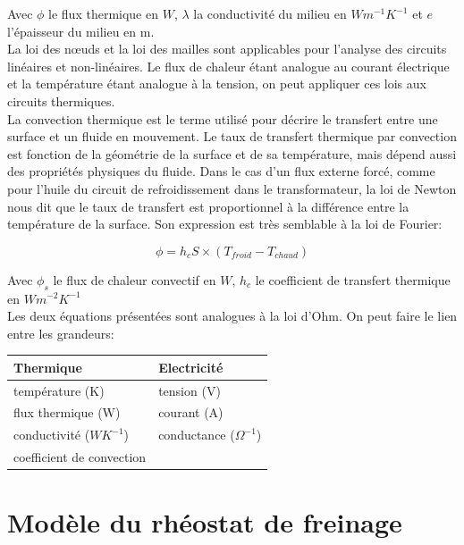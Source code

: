 \documentclass[a4paper]{report}
\begin{document}
	Avec $ \phi $ le flux thermique en $ W $, $ \lambda $ la conductivité du milieu en $ W m^{-1} K^{-1} $ et $ e $ l'épaisseur du milieu en m.\\
	
	La loi des nœuds et la loi des mailles sont applicables pour l'analyse des circuits linéaires et non-linéaires. Le flux de chaleur étant analogue au courant électrique et la température étant analogue à la tension, on peut appliquer ces lois aux circuits thermiques.\\
	
	La convection thermique est le terme utilisé pour décrire le transfert entre une surface et un fluide en
	mouvement. Le taux de transfert thermique par convection est fonction de la géométrie de la surface et de sa 
	température, mais dépend aussi des propriétés physiques du fluide. Dans le cas d'un flux externe forcé, comme pour l'huile du circuit de refroidissement dans le transformateur,  la loi de Newton nous dit que le taux de transfert est proportionnel à la différence entre la température de la surface. Son expression est très semblable à la loi de Fourier:
	
	\begin{equation}
		\phi = h_c S \times (T_{froid} - T_{chaud}) 
	\end{equation}
	
	Avec $ \phi_s $ le flux de chaleur convectif en $ W $, $h_c$ le coefficient de transfert thermique en $ W 			m^{-2} K^{-1} $ \\
	
	Les deux équations présentées sont analogues à la loi d'Ohm. On peut faire le lien entre les grandeurs:
	\begin{center}
		\begin{tabular}{|l||l|}
			\hline
			Thermique                 & Electricité                \\
			\hline
			température (K)          & tension (V)                 \\
			\hline
			flux thermique (W)        & courant (A)                 \\
			\hline
			conductivité ($WK^{-1}$) & conductance ($\Omega^{-1}$) \\
			coefficient de convection &                             \\
			\hline
		\end{tabular}
	\end{center}
	
	\section{Modèle du rhéostat de freinage}
	
\end{document}
